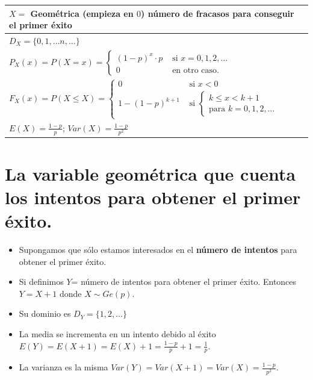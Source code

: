 \documentclass[
  letterpaper,
  DIV=11,
  numbers=noendperiod]{scrreprt}
\providecommand{\tightlist}{%
  \setlength{\itemsep}{0pt}\setlength{\parskip}{0pt}}\usepackage{longtable,booktabs,array}
\begin{document}
\renewcommand{\arraystretch}{1.75}
\begin{table}
\centering
\begin{tabular}{|l|}
\hline\rowcolor{LightBlue}
$X=$ Geométrica (empieza en $0$) número de fracasos  para conseguir el primer éxito
\\\hline
$D_X=\{0,1,\ldots n,\ldots\}$ \\\hline
$P_X(x)=P(X=x)=\left\{\begin{array}{ll}(1-p)^{x}\cdot p & \mbox{ si } x=0,1,2,\ldots \\0  & \mbox{ en otro caso.}\end{array}\right.$\\\hline
$F_X(x)=P(X\leq X)=\left\{\begin{array}{ll} 0 & \mbox{ si } x<0\\
  1- (1-p)^{k+1} & \mbox{ si } \left\{ \begin{array}{l}k\leq x< k+1\\\mbox{para } k=0,1,2,\ldots\end{array}
    \right.\end{array}\right.$ \\\hline
$E(X)=\frac{1-p}{p}$; $Var(X)=\frac{1-p}{p^2}$\\\hline
\end{tabular}
\end{table}

\section{La variable geométrica que cuenta los intentos para obtener el
primer
éxito.}\label{la-variable-geomuxe9trica-que-cuenta-los-intentos-para-obtener-el-primer-uxe9xito.}

\begin{itemize}
\tightlist
\item
  Supongamos que sólo estamos interesados en el \textbf{número de
  intentos} para obtener el primer éxito.
\item
  Si definimos \(Y\)= número de intentos para obtener el primer éxito.
  Entonces \(Y=X+1\) donde \(X\sim Ge(p)\).
\item
  Su dominio es \(D_Y=\{1,2,\ldots\}\)
\item
  La media se incrementa en un intento debido al éxito
  \(E(Y)=E(X+1)=E(X)+1=\frac{1-p}{p}+1=\frac1{p}\).
\item
  La varianza es la misma \(Var(Y)=Var(X+1)=Var(X)=\frac{1-p}{p^2}\).
\end{itemize}
\end{document}
